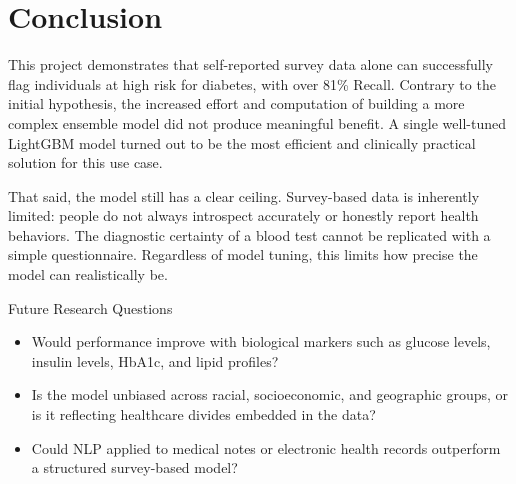 \documentclass[11pt,letterpaper]{article}
\begin{document}
\section{Conclusion}
This project demonstrates that self-reported survey data alone can successfully flag individuals at high risk for diabetes, with over 81\% Recall. Contrary to the initial hypothesis, the increased effort and computation of building a more complex ensemble model did not produce meaningful benefit. A single well-tuned LightGBM model turned out to be the most efficient and clinically practical solution for this use case.

That said, the model still has a clear ceiling. Survey-based data is inherently limited: people do not always introspect accurately or honestly report health behaviors. The diagnostic certainty of a blood test cannot be replicated with a simple questionnaire. Regardless of model tuning, this limits how precise the model can realistically be.

\begin{insightbox}{Future Research Questions}
\begin{itemize}[leftmargin=*, itemsep=0.35em]
  \item Would performance improve with biological markers such as glucose levels, insulin levels, HbA1c, and lipid profiles?
  \item Is the model unbiased across racial, socioeconomic, and geographic groups, or is it reflecting healthcare divides embedded in the data?
  \item Could NLP applied to medical notes or electronic health records outperform a structured survey-based model?
\end{itemize}
\end{insightbox}
\end{document}
